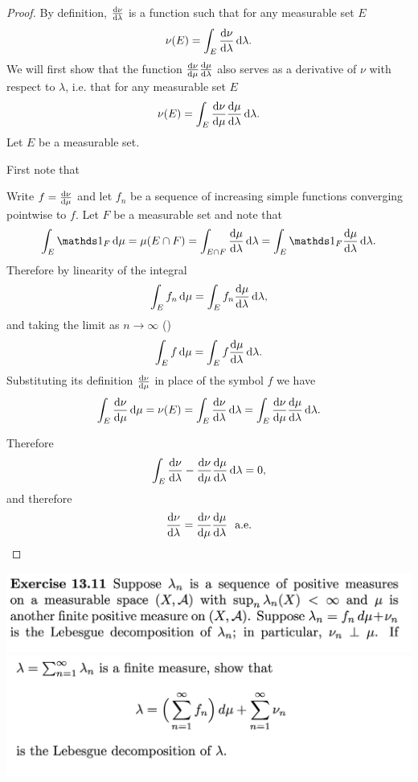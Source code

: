 \begin{proof}
  By definition, $\frac{\d\nu}{\d\lambda}$ is a function such that for any measurable set $E$
  \begin{align*}
    \nu(E) = \int_E \frac{\d\nu}{\d\lambda} \d\lambda.
  \end{align*}
  We will first show that the function $\frac{\d\nu}{\d\mu}\frac{\d\mu}{\d\lambda}$ also serves as a derivative
  of $\nu$ with respect to $\lambda$, i.e. that for any measurable set $E$
  \begin{align*}
    \nu(E) = \int_E \frac{\d\nu}{\d\mu}\frac{\d\mu}{\d\lambda} \d\lambda.
  \end{align*}
  Let $E$ be a measurable set.

  First note that

  Write $f = \frac{\d\nu}{\d\mu}$ and let $f_n$ be a sequence of increasing simple functions converging
  pointwise to $f$. Let $F$ be a measurable set and note that
  \begin{align*}
    \int_E \ind_F \d\mu
    = \mu(E \cap F)
    = \int_{E \cap F} \frac{\d\mu}{\d\lambda} \d\lambda
    = \int_E \ind_F \frac{\d\mu}{\d\lambda} \d\lambda.
  \end{align*}
  Therefore by linearity of the integral
  \begin{align*}
    \int_E f_n \d\mu = \int_{E} f_n \frac{\d\mu}{\d\lambda}\d\lambda,
  \end{align*}
  and taking the limit as $n \to \infty$ ()
  \begin{align*}
    \int_E f \d\mu = \int_{E} f \frac{\d\mu}{\d\lambda}\d\lambda.
  \end{align*}
  Substituting its definition $\frac{\d\nu}{\d\mu}$ in place of the symbol $f$ we have
  \begin{align*}
    \int_E \frac{\d\nu}{\d\mu} \d\mu
    = \nu(E)
    = \int_E \frac{\d\nu}{\d\lambda} \d\lambda
    = \int_{E} \frac{\d\nu}{\d\mu} \frac{\d\mu}{\d\lambda}\d\lambda.
  \end{align*}

  Therefore
  \begin{align*}
    \int_E \frac{\d\nu}{\d\lambda}  - \frac{\d\nu}{\d\mu}\frac{\d\mu}{\d\lambda} \d\lambda = 0,
  \end{align*}
  and therefore
  \begin{align*}
    \frac{\d\nu}{\d\lambda} = \frac{\d\nu}{\d\mu}\frac{\d\mu}{\d\lambda} \ae
  \end{align*}
\end{proof}

\begin{mdframed}
\includegraphics[width=400pt]{img/analysis--berkeley-202a-hw11-c5a4.png}
\includegraphics[width=400pt]{img/analysis--berkeley-202a-hw11-3974.png}
\end{mdframed}